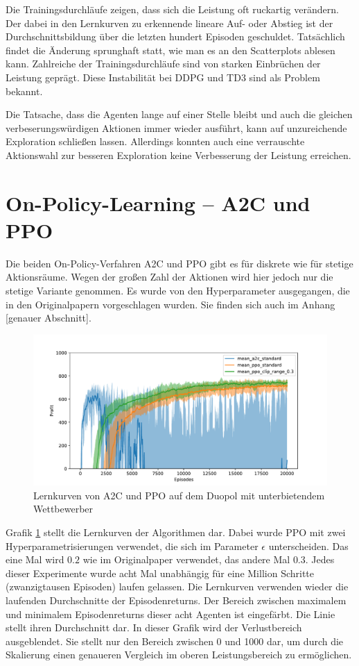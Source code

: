 Die Trainingsdurchläufe zeigen, dass sich die Leistung oft ruckartig verändern.
Der dabei in den Lernkurven zu erkennende lineare Auf- oder Abstieg ist der Durchschnittsbildung über die letzten hundert Episoden geschuldet.
Tatsächlich findet die Änderung sprunghaft statt, wie man es an den Scatterplots ablesen kann.
Zahlreiche der Trainingsdurchläufe sind von starken Einbrüchen der Leistung geprägt.
Diese Instabilität bei DDPG und TD3 sind als Problem bekannt.

Die Tatsache, dass die Agenten lange auf einer Stelle bleibt und auch die gleichen verbeserungswürdigen Aktionen immer wieder ausführt, kann auf unzureichende Exploration schließen lassen.
Allerdings konnten auch eine verrauschte Aktionswahl zur besseren Exploration keine Verbesserung der Leistung erreichen.

\section{On-Policy-Learning -- A2C und PPO}
\label{section:main_ppo}
Die beiden On-Policy-Verfahren A2C und PPO gibt es für diskrete wie für stetige Aktionsräume.
Wegen der großen Zahl der Aktionen wird hier jedoch nur die stetige Variante genommen.
Es wurde von den Hyperparameter ausgegangen, die in den Originalpapern vorgeschlagen wurden.
Sie finden sich auch im Anhang [genauer Abschnitt].

\begin{figure}[htbp]
	\centering
	\includegraphics[width=\textwidth]{main/a2c_vs_ppo.pdf}
	\caption{Lernkurven von A2C und PPO auf dem Duopol mit unterbietendem Wettbewerber}
	\label{grafic:OnPolicyLearningCurves}
\end{figure}

Grafik \ref{grafic:OnPolicyLearningCurves} stellt die Lernkurven der Algorithmen dar.
Dabei wurde PPO mit zwei Hyperparametrisierungen verwendet, die sich im Parameter $\epsilon$ unterscheiden.
Das eine Mal wird $0.2$ wie im Originalpaper verwendet, das andere Mal $0.3$.
Jedes dieser Experimente wurde acht Mal unabhängig für eine Million Schritte (zwanzigtausen Episoden) laufen gelassen.
Die Lernkurven verwenden wieder die laufenden Durchschnitte der Episodenreturns.
Der Bereich zwischen maximalem und minimalem Episodenreturns dieser acht Agenten ist eingefärbt.
Die Linie stellt ihren Durchschnitt dar.
In dieser Grafik wird der Verlustbereich ausgeblendet.
Sie stellt nur den Bereich zwischen 0 und 1000 dar, um durch die Skalierung einen genaueren Vergleich im oberen Leistungsbereich zu ermöglichen.

